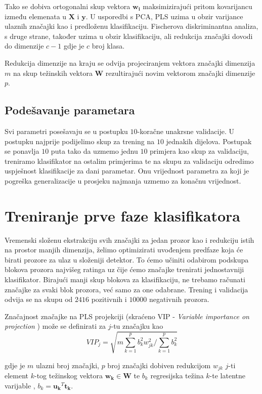 \documentclass[seminar]{fer}
\begin{document}
Tako se dobiva ortogonalni skup vektora $\mathbf{w_i}$ maksimizirajući pritom kovarijancu između elemenata u $\mathbf{X}$ i $\mathbf{y}$. U usporedbi s PCA, PLS uzima u obzir varijance ulaznih značajki kao i predloženu klasifikaciju. Fischerova diskriminantna analiza, s druge strane, također uzima u obzir klasifikaciju, ali redukcija značajki dovodi do dimenzije $c - 1$ gdje je $c$ broj klasa. 

Redukcija dimenzije na kraju se odvija projeciranjem vektora značajki dimenzija $m$ na skup težinskih vektora $\mathbf{W}$ rezultirajući novim vektorom značajki dimenzije $p$.

\subsection{Podešavanje parametara}
Svi parametri posešavaju se u postupku $10$-koračne unakrsne validacije. U postupku najprije podijelimo skup za trening na $10$ jednakih dijelova. Postupak se ponavlja $10$ puta tako da uzmemo jednu $10$ primjera kao skup za validaciju, treniramo klasifikator na ostalim primjerima te na skupu za validaciju odredimo uspješnost klasifikacije za dani parametar. Onu vrijednost parametra za koji je pogreška generalizacije u prosjeku najmanja uzmemo za konačnu vrijednost. 

\section{Treniranje prve faze klasifikatora}
Vremenski složenu ekstrakciju svih značajki za jedan prozor kao i redukciju istih na prostor manjih dimenzija, želimo optimizirati uvođenjem predfaze koja će birati prozore za ulaz u složeniji detektor. To ćemo učiniti odabirom podskupa blokova prozora najvišeg ratinga uz čije ćemo značajke trenirati jednostavniji klasifikator. Birajući manji skup blokova za klasifikaciju, ne trebamo  računati značajke za svaki blok prozora, već samo za one odabrane. Trening i validacija odvija se na skupu od $2416$ pozitivnih i $10000$ negativnih prozora.

Značajnost značajke na  PLS projekciji (skraćeno VIP - \emph{Variable importance on projection} ) \cite{VIP} može se definirati za $j$-tu značajku kao
\begin{equation*}
VIP_j = \sqrt{m \sum_{k = 1}^{p} b_k^2 w_{jk} ^ 2 / \sum_{k = 1}^{p} b_k ^2}
\end{equation*}

gdje je $m$ ulazni broj značajki, $p$ broj značajki dobiven redukcijom $w_{jk}$ $j$-ti element $k$-tog težinskog vektora $\mathbf{w_k} \in \mathbf{W}$ te $b_k$  regresijska težina  $k$-te latentne varijable \cite{PLS}, $b_k = \mathbf{u_k}^T \mathbf{t_k}$.
\end{document}
